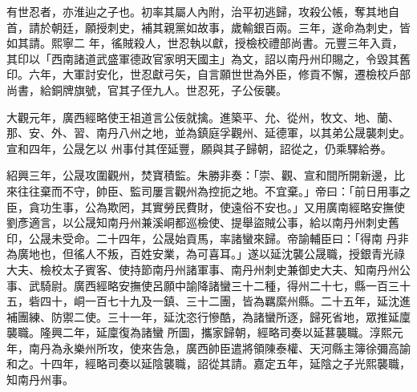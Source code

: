 \begin{pinyinscope}
 有世忍者，亦淮辿之子也。初率其屬人內附，治平初逃歸，攻殺公帳，奪其地自首，請於朝廷，願授刺史，補其親黨如故事，歲輸銀百兩。三年，遂命為刺史，皆如其請。熙寧二
 年，徭賊殺人，世忍執以獻，授檢校禮部尚書。元豐三年入貢，其印以「西南諸道武盛軍德政官家明天國主」為文，詔以南丹州印賜之，令毀其舊印。六年，大軍討安化，世忍獻弓矢，自言願世世為外臣，修貢不懈，遷檢校戶部尚書，給銅牌旗號，官其子侄九人。世忍死，子公佞襲。



 大觀元年，廣西經略使王祖道言公佞就擒。進築平、允、從州，牧文、地、蘭、那、安、外、習、南丹八州之地，並為鎮庭孚觀州、延德軍，以其弟公晟襲刺史。宣和四年，公晟乞以
 州事付其侄延豐，願與其子歸朝，詔從之，仍乘驛給券。



 紹興三年，公晟攻圍觀州，焚寶積監。朱勝非奏：「崇、觀、宣和間所開新邊，比來往往棄而不守，帥臣、監司屢言觀州為控扼之地。不宜棄。」帝曰：「前日用事之臣，貪功生事，公為欺罔，其實勞民費財，使遠俗不安也。」又用廣南經略安撫使劉彥適言，以公晟知南丹州兼溪峒都巡檢使、提舉盜賊公事，給以南丹州刺史舊印，公晟未受命。二十四年，公晟始貢馬，率諸蠻來歸。帝諭輔臣曰：「得南
 丹非為廣地也，但徭人不叛，百姓安業，為可喜耳。」遂以延沈襲公晟職，授銀青光祿大夫、檢校太子賓客、使持節南丹州諸軍事、南丹州刺史兼御史大夫、知南丹州公事、武騎尉。廣西經略安撫使呂願中諭降諸蠻三十二種，得州二十七，縣一百三十五，砦四十，峒一百七十九及一鎮、三十二團，皆為羈縻州縣。二十五年，延沈進補團練、防禦二使。三十一年，延沈恣行慘酷，為諸蠻所逐，歸死省地，眾推延廩襲職。隆興二年，延廩復為諸蠻
 所圖，攜家歸朝，經略司奏以延葚襲職。淳熙元年，南丹為永樂州所攻，使來告急，廣西帥臣遣將領陳泰權、天河縣主簿徐彌高諭和之。十四年，經略司奏以延陰襲職，詔從其請。嘉定五年，延陰之子光熙襲職，知南丹州事。



\end{pinyinscope}